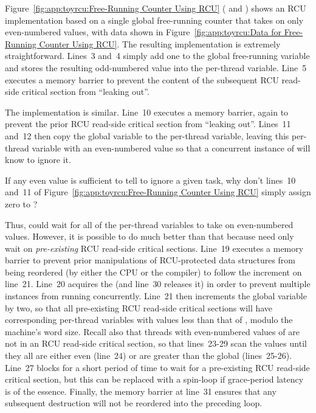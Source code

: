 Figure~\ref{fig:app:toyrcu:Free-Running Counter Using RCU}
( and )
shows an RCU implementation based on a single global free-running counter
that takes on only even-numbered values, with data shown in
Figure~\ref{fig:app:toyrcu:Data for Free-Running Counter Using RCU}.
The resulting  implementation is extremely
straightforward.
Lines~3 and~4 simply add one to the global free-running 
variable and stores the resulting odd-numbered value into the
 per-thread variable.
Line~5 executes a memory barrier to prevent the content of the
subsequent RCU read-side critical section from ``leaking out''.

The  implementation is similar.
Line~10 executes a memory barrier, again to prevent the prior RCU
read-side critical section from ``leaking out''.
Lines~11 and~12 then copy the  global variable to the
 per-thread variable, leaving this per-thread
variable with an even-numbered value so that a concurrent instance
of  will know to ignore it.

\QuickQuiz{}
	If any even value is sufficient to tell 
	to ignore a given task, why don't lines~10 and~11 of
	Figure~\ref{fig:app:toyrcu:Free-Running Counter Using RCU}
	simply assign zero to ?
 \QuickQuizEnd

Thus,  could wait for all of the per-thread
 variables to take on even-numbered values.
However, it is possible to do much better than that because
 need only wait on \emph{pre-existing}
RCU read-side critical sections.
Line~19 executes a memory barrier to prevent prior manipulations
of RCU-protected data structures from being reordered (by either
the CPU or the compiler) to follow the increment on line~21.
Line~20 acquires the  (and line~30 releases it)
in order to prevent multiple
 instances from running concurrently.
Line~21 then increments the global  variable by
two, so that all pre-existing RCU read-side critical sections will
have corresponding per-thread  variables with
values less than that of , modulo the machine's
word size.
Recall also that threads with even-numbered values of 
are not in an RCU read-side critical section,
so that lines~23-29 scan the  values until they
all are either even (line~24) or are greater than the global
 (lines~25-26).
Line~27 blocks for a short period of time to wait for a
pre-existing RCU read-side critical section, but this can be replaced with
a spin-loop if grace-period latency is of the essence.
Finally, the memory barrier at line~31 ensures that any subsequent
destruction will not be reordered into the preceding loop.

